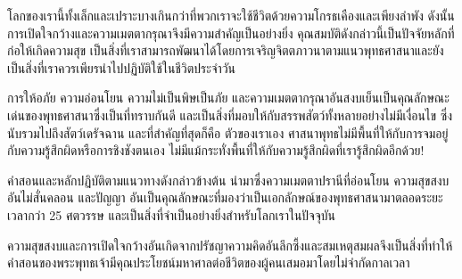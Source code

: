 \documentclass[12pt, openany]{book}
\begin{document}
โลก{\wbr}ของ{\wbr}เรา{\wbr}นี้{\wbr}ทั้ง{\wbr}เล็ก{\wbr}และ{\wbr}เปราะบาง{\wbr}เกิน{\wbr}กว่า{\wbr}ที่{\wbr}พวก{\wbr}เรา{\wbr}จะ{\wbr}ใช้{\wbr}ชีวิต{\wbr}ด้วย{\wbr}ความ{\wbr}โกรธ{\wbr}เคือง{\wbr}และ{\wbr}เพียง{\wbr}ลำพัง  ดังนั้น การ{\wbr}เปิด{\wbr}ใจ{\wbr}กว้าง{\wbr}และ{\wbr}ความ{\wbr}เมตตา{\wbr}กรุณา{\wbr}จึง{\wbr}มี{\wbr}ความ{\wbr}สำคัญ{\wbr}เป็น{\wbr}อย่าง{\wbr}ยิ่ง  คุณสมบัติ{\wbr}ดัง{\wbr}กล่าว{\wbr}นี้{\wbr}เป็น{\wbr}ปัจจัย{\wbr}หลัก{\wbr}ที่{\wbr}ก่อ{\wbr}ให้{\wbr}เกิด{\wbr}ความ{\wbr}สุข เป็น{\wbr}สิ่ง{\wbr}ที่{\wbr}เรา{\wbr}สามารถ{\wbr}พัฒนา{\wbr}ได้{\wbr}โดย{\wbr}การ{\wbr}เจริญ{\wbr}จิตตภาวนา{\wbr}ตาม{\wbr}แนว{\wbr}พุทธ{\wbr}ศาสนา{\wbr}และ{\wbr}ยัง{\wbr}เป็น{\wbr}สิ่ง{\wbr}ที่{\wbr}เรา{\wbr}ควร{\wbr}เพียร{\wbr}นำ{\wbr}ไป{\wbr}ปฏิบัติใช้ใน{\wbr}ชีวิต{\wbr}ประจำ{\wbr}วัน  

การ{\wbr}ให้{\wbr}อภัย ความ{\wbr}อ่อนโยน ความ{\wbr}ไม่{\wbr}เป็น{\wbr}พิษ{\wbr}เป็น{\wbr}ภัย และ{\wbr}ความ{\wbr}เมตตา{\wbr}กรุณา{\wbr}อัน{\wbr}สงบ{\wbr}เย็น{\wbr}เป็น{\wbr}คุณลักษณะ{\wbr}เด่น{\wbr}ของ{\wbr}พุทธ{\wbr}ศาสนา{\wbr}ซึ่ง{\wbr}เป็น{\wbr}ที่{\wbr}ทราบ{\wbr}กัน{\wbr}ดี และ{\wbr}เป็น{\wbr}สิ่ง{\wbr}ที่{\wbr}มอบ{\wbr}ให้{\wbr}กับ{\wbr}สรรพ{\wbr}สัตว์{\wbr}ทั้งหลาย{\wbr}อย่าง{\wbr}ไม่{\wbr}มี{\wbr}เงื่อนไข ซึ่ง{\wbr}นับ{\wbr}รวม{\wbr}ไป{\wbr}ถึง{\wbr}สัตว์{\wbr}เดรัจฉาน และ{\wbr}ที่{\wbr}สำคัญ{\wbr}ที่สุด{\wbr}ก็{\wbr}คือ ตัว{\wbr}ของ{\wbr}เรา{\wbr}เอง  ศาสนา{\wbr}พุทธ{\wbr}ไม่{\wbr}มี{\wbr}พื้นที่{\wbr}ให้{\wbr}กับ{\wbr}การ{\wbr}จม{\wbr}อยู่{\wbr}กับ{\wbr}ความ{\wbr}รู้สึก{\wbr}ผิด{\wbr}หรือ{\wbr}การ{\wbr}ชิงชัง{\wbr}ตนเอง ไม่{\wbr}มี{\wbr}แม้{\wbr}กระทั่ง{\wbr}พื้นที่{\wbr}ให้{\wbr}กับ{\wbr}ความ{\wbr}รู้สึก{\wbr}ผิด{\wbr}ที่{\wbr}เรา{\wbr}รู้สึก{\wbr}ผิด{\wbr}อีก{\wbr}ด้วย!

คำ{\wbr}สอน{\wbr}และ{\wbr}หลัก{\wbr}ปฏิบัติ{\wbr}ตาม{\wbr}แนวทาง{\wbr}ดัง{\wbr}กล่าว{\wbr}ข้าง{\wbr}ต้น นำ{\wbr}มา{\wbr}ซึ่ง{\wbr}ความ{\wbr}เมตตา{\wbr}ปรานี{\wbr}ที่{\wbr}อ่อนโยน ความ{\wbr}สุข{\wbr}สงบ{\wbr}อัน{\wbr}ไม่{\wbr}สั่น{\wbr}คลอน และ{\wbr}ปัญญา อัน{\wbr}เป็น{\wbr}คุณลักษณะ{\wbr}ที่{\wbr}มอง{\wbr}ว่า{\wbr}เป็น{\wbr}เอกลักษณ์{\wbr}ของ{\wbr}พุทธ{\wbr}ศาสนา{\wbr}มา{\wbr}ตลอด{\wbr}ระยะ{\wbr}เวลา{\wbr}กว่า 25 ศตวรรษ และ{\wbr}เป็น{\wbr}สิ่ง{\wbr}ที่{\wbr}จำเป็น{\wbr}อย่าง{\wbr}ยิ่ง{\wbr}สำหรับ{\wbr}โลก{\wbr}เรา{\wbr}ใน{\wbr}ปัจจุบัน  

ความ{\wbr}สุข{\wbr}สงบ{\wbr}และ{\wbr}การ{\wbr}เปิด{\wbr}ใจ{\wbr}กว้าง{\wbr}อัน{\wbr}เกิด{\wbr}จาก{\wbr}ปรัชญา{\wbr}ความคิด{\wbr}อัน{\wbr}ลึกซึ้ง{\wbr}และ{\wbr}สม{\wbr}เหตุ{\wbr}สม{\wbr}ผล{\wbr}จึง{\wbr}เป็น{\wbr}สิ่ง{\wbr}ที่{\wbr}ทำให้{\wbr}คำ{\wbr}สอน{\wbr}ของ{\wbr}พระพุทธเจ้า{\wbr}มี{\wbr}คุณ{\wbr}ประโยชน์{\wbr}มหาศาล{\wbr}ต่อ{\wbr}ชีวิต{\wbr}ของ{\wbr}ผู้คน{\wbr}เสมอ{\wbr}มา{\wbr}โดย{\wbr}ไม่{\wbr}จำกัด{\wbr}กาล{\wbr}เวลา 
\end{document}
